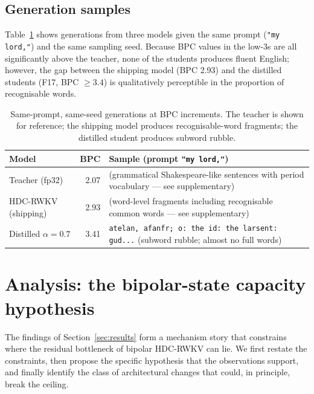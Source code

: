 \documentclass[runningheads]{llncs}
\begin{document}
\subsection{Generation samples}
\label{sec:results:gen}

Table~\ref{tab:gen} shows generations from three models given the
same prompt (\texttt{"my lord,"}) and the same sampling seed.
Because BPC values in the low-3s are all significantly above the
teacher, none of the students produces fluent English; however, the
gap between the shipping model (BPC 2.93) and the distilled
students (F17, BPC ${\geq}3.4$) is qualitatively perceptible in the
proportion of recognisable words.

\begin{table}[h]
\centering
\caption{Same-prompt, same-seed generations at BPC increments. The
teacher is shown for reference; the shipping model produces
recognisable-word fragments; the distilled student produces
subword rubble.}
\label{tab:gen}
\small
\begin{tabular}{@{}p{22mm}rp{85mm}@{}}
\toprule
Model & BPC & Sample (prompt \texttt{"my lord,"}) \\
\midrule
Teacher (fp32) & 2.07 & (grammatical Shakespeare-like sentences with period vocabulary --- see supplementary) \\
HDC-RWKV (shipping) & 2.93 & (word-level fragments including recognisable common words --- see supplementary) \\
Distilled $\alpha{=}0.7$ & 3.41 & \texttt{atelan, afanfr; o: the id: the larsent: gud...} (subword rubble; almost no full words) \\
\bottomrule
\end{tabular}
\end{table}


\section{Analysis: the bipolar-state capacity hypothesis}
\label{sec:analysis}

The findings of Section~\ref{sec:results} form a mechanism story that
constrains where the residual bottleneck of bipolar HDC-RWKV can lie.
We first restate the constraints, then propose the specific
hypothesis that the observations support, and finally identify the
class of architectural changes that could, in principle, break the
ceiling.
\end{document}
